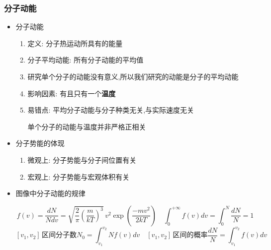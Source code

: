 \documentclass{article}
\begin{document}
\vspace{2em}

\subsubsection{分子动能}
\begin{itemize}
    \item 分子动能
          \begin{enumerate}[label = (\arabic*)]
              \item 定义: 分子热运动所具有的能量
              \item 分子平均动能: 所有分子动能的平均值
              \item 研究单个分子的动能没有意义,所以我们研究的动能是分子的平均动能
              \item 影响因素: 有且只有一个\textbf{温度}
              \item 易错点: 平均分子动能与分子种类无关,与实际速度无关

                    \hspace{3.7em}单个分子的动能与温度并非严格正相关
          \end{enumerate}
    \item 分子势能的体现
          \begin{enumerate}[label = (\arabic*)]
              \item 微观上: 分子势能与分子间位置有关
              \item 宏观上: 分子势能与宏观体积有关
          \end{enumerate}
    \item 图像中分子动能的规律

          \vspace{-1em}
          \begin{adjustbox}{minipage=0.91\linewidth, bgcolor=gray!20, padding=1em}
              \small %
              $$ f(v)= \frac{dN}{Ndv} ={\sqrt {{\frac {2}{\pi }}\left({\frac {m}{kT}}\right)^{3}}}\,v^{2}\exp \left({\frac {-mv^{2}}{2kT}}\right)  \quad
                  \int_{0}^{+\infty} f(v) dv  = \int_{0}^{N} \frac{dN}{N} = 1
              $$
              $$
                  [v_{1},v_{2}] \, \text{区间分子数} N_{0} = \int_{v_{1}}^{v_{2}} N f(v) dv  \quad [v_{1},v_{2}] \, \text{区间的概率} \frac{dN}{N} = \int_{v_{1}}^{v_{2}} f(v) dv
              $$
          \end{adjustbox}
          \vspace{-1em}


\end{itemize}
\end{document}
